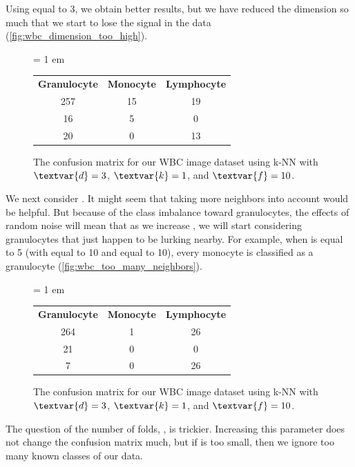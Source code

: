 Using  equal to 3, we obtain better results, but we have reduced the dimension so much that we start to lose the signal in the data (\autoref{fig:wbc_dimension_too_high}).\\

\begin{figure}[h]
\centering
\tabcolsep = 1 em
\mySfFamily
{}
\begin{tabular}{c c c}
\rowcolor{gray!50}
\textbf{Granulocyte} & \textbf{Monocyte} & \textbf{Lymphocyte} \\
257 & 15 & 19 \\
16 & 5 & 0 \\
20 & 0 & 13
\end{tabular}
\caption{The confusion matrix for our WBC image dataset using k-NN with $\textvar{d} = \text{3}$, $\textvar{k} = \text{1}$, and $\textvar{f} = \text{10}$.}
\label{fig:wbc_dimension_too_high}
\end{figure}

We next consider . It might seem that taking more neighbors into account would be helpful. But because of the class imbalance toward granulocytes, the effects of random noise will mean that as we increase , we will start considering granulocytes that just happen to be lurking nearby. For example, when  is equal to 5 (with  equal to 10 and  equal to 10), every monocyte is classified as a granulocyte (\autoref{fig:wbc_too_many_neighbors}).\\



\begin{figure}[h]
\centering
\tabcolsep = 1 em
\mySfFamily
{}
\begin{tabular}{c c c}
\rowcolor{gray!50}
\textbf{Granulocyte} & \textbf{Monocyte} & \textbf{Lymphocyte} \\
264 & 1 & 26 \\
21 & 0 & 0 \\
7 & 0 & 26
\end{tabular}
\caption{The confusion matrix for our WBC image dataset using k-NN with $\textvar{d} = \text{3}$, $\textvar{k} = \text{1}$, and $\textvar{f} = \text{10}$.}
\label{fig:wbc_too_many_neighbors}
\end{figure}

The question of the number of folds, , is trickier. Increasing this parameter does not change the confusion matrix much, but if  is too small, then we ignore too many known classes of our data.

